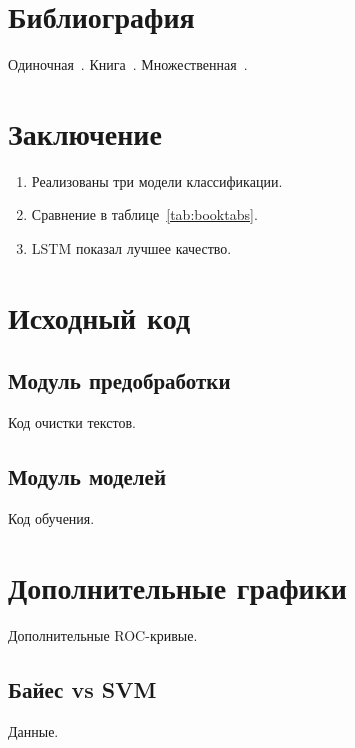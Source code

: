 \documentclass[font=modern]{cmcmsuthesis-bachelor}
\begin{document}
\section{Библиография}
Одиночная~\cite{shannon1948}. Книга~\cite{knuth1984}.
Множественная~\cite{shannon1948,knuth1984,macwilliams1979}.

\section*{Заключение}
\begin{enumerate}
\item Реализованы три модели классификации.
\item Сравнение в таблице~\ref{tab:booktabs}.
\item LSTM показал лучшее качество.
\end{enumerate}

\clearpage\listoftables{}
\printbibliography

\appendix
\section{Исходный код}
\subsection{Модуль предобработки}
Код очистки текстов.
\subsection{Модуль моделей}
Код обучения.

\section{Дополнительные графики}
Дополнительные ROC-кривые.
\subsection{Байес vs SVM}
Данные.
\end{document}
